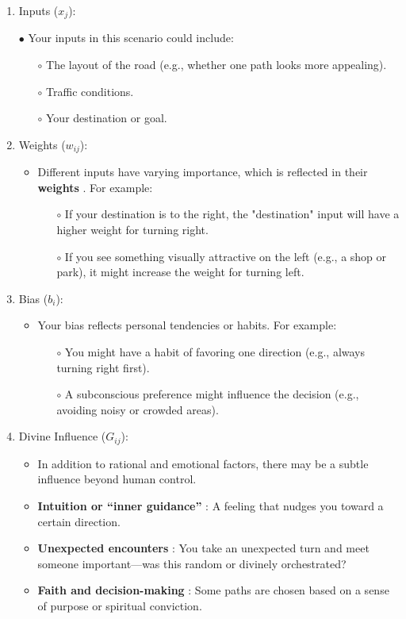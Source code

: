 \documentclass{article}
\begin{document}
\begin{enumerate}[1.]
\item  Inputs ($x_j$):  

$\bullet$  Your inputs in this scenario could include:

\begin{itemize}
\item[$\circ$]  The layout of the road (e.g., whether one path looks more appealing).
\item[$\circ$]  Traffic conditions.
\item[$\circ$]  Your destination or goal.
\end{itemize}


\item   Weights ($w_{ij}$):

\begin{itemize}  
\item Different inputs have varying importance, which is reflected in their {\bf weights} . For example:

\begin{itemize}
\item[$\circ$]   If your destination is to the right, the "destination" input will have a higher weight for turning right.
\item[$\circ$]  If you see something visually attractive on the left (e.g., a shop or park), it might increase the weight for turning left.
\end{itemize}
\end{itemize}

\item   Bias ($b_i$):

\begin{itemize}  
\item   Your bias reflects personal tendencies or habits. For example:

\begin{itemize}
\item[$\circ$]  You might have a habit of favoring one direction (e.g., always turning right first).
\item[$\circ$]  A subconscious preference might influence the decision (e.g., avoiding noisy or crowded areas).
\end{itemize}
\end{itemize}

\item   Divine Influence ($G_{ij}$):

\begin{itemize}
\item In addition to rational and emotional factors, there may be a subtle influence beyond human control.
\item {\bf Intuition or ``inner guidance''} : A feeling that nudges you toward a certain direction.
\item {\bf Unexpected encounters} : You take an unexpected turn and meet someone important---was this random or divinely orchestrated?
\item {\bf Faith and decision-making} : Some paths are chosen based on a sense of purpose or spiritual conviction.
\end{itemize}


\end{enumerate}
\end{document}
